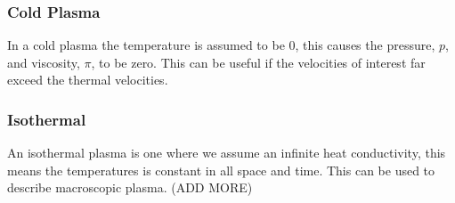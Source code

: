 	\subsubsection{Cold Plasma}
	In a cold plasma the temperature is assumed to be \(0\), this causes the pressure, \(p\), and viscosity, \(\pi\), to be zero.
	This can be useful if the velocities of interest far exceed the thermal velocities.



	\subsubsection{Isothermal}
	An isothermal plasma is one where we assume an infinite heat conductivity,
	this means the temperatures is constant in all space and time. This can be used to
	describe macroscopic plasma.
	(ADD MORE)
